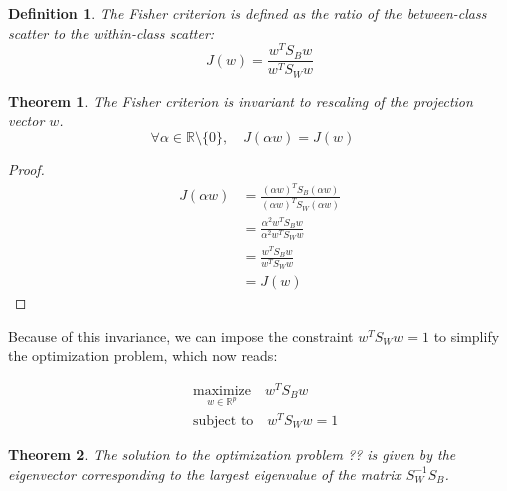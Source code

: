 \documentclass[a4paper,12pt]{article}
\newtheorem{theorem}{Theorem}
\newtheorem{definition}{Definition}
\begin{document}
\begin{definition}
The Fisher criterion is defined as the ratio of the between-class scatter to the within-class scatter:
\[
J(w) = \frac{w^T S_B w}{w^T S_W w}
\]
\end{definition}


\begin{theorem}
The Fisher criterion is invariant to rescaling of the projection vector $w$.
\[
\forall \alpha \in \mathbb{R} \setminus \{0\}, \quad J(\alpha w) = J(w) \quad
\]
\end{theorem}

\begin{proof}
\begin{align*}
J(\alpha w) &= \frac{(\alpha w)^T S_B (\alpha w)}{(\alpha w)^T S_W (\alpha w)} \\
& = \frac{\alpha^2 w^T S_B w}{\alpha^2 w^T S_W w} \\
& = \frac{w^T S_B w}{w^T S_W w} \\
& = J(w)
\end{align*}
\end{proof}

Because of this invariance, we can impose the constraint $w^T S_W w = 1$ to simplify the optimization problem, which now reads:

\begin{align*}
& \underset{w \in \mathbb{R}^p}{\mathrm{maximize}} \quad w^T S_B w \\
& \text{subject to} \quad w^T S_W w = 1
\end{align*}

\begin{theorem}
The solution to the optimization problem ?? is given by the eigenvector corresponding to the largest eigenvalue of the matrix $S_W^{-1} S_B$.
\end{theorem}
\end{document}
